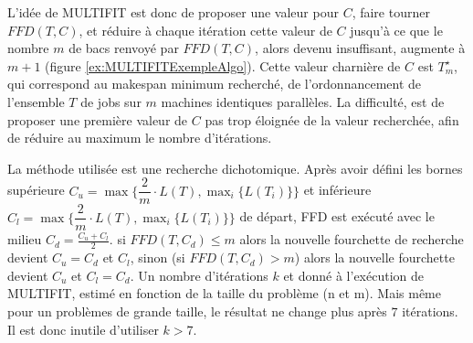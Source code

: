 \documentclass[a4paper,12pt]{report}
\theoremstyle{plain}				%
\theoremstyle{definition}				%
\newcommand{\tdi}[1]{\todo[inline]{{#1}}{}}
\newcommand{\lp}[1]{\todo[author=LP,color=yellow,inline]{#1}}
\begin{document}
\bigskip


L'idée de MULTIFIT est donc de proposer une valeur pour $C$, faire
tourner $FFD(T,C) $, et réduire à chaque itération cette valeur de $C$
jusqu'à ce que le nombre $m$ de bacs renvoyé par $FFD(T,C) $, alors
devenu insuffisant, augmente à $m+1$ (figure \ref{ex:MULTIFITExempleAlgo}).
Cette valeur charnière de $C$ est $T_m^\star$, qui correspond au
makespan minimum recherché, de l'ordonnancement de l'ensemble $T$ de
jobs sur $m$ machines identiques parallèles.
La difficulté, est de proposer une première valeur de $C$ pas trop
éloignée de la valeur recherchée, afin de réduire au maximum le nombre
d'itérations.

La méthode utilisée est une recherche dichotomique.
Après avoir défini les bornes supérieure
$C_u = \max\{\dfrac{2}{m} \cdot L(T), \max_i\{L(T_i)\} \}$ et
inférieure $C_l = \max\{\dfrac{2}{m} \cdot L(T), \max_i\{L(T_i)\} \}$
de départ, FFD est exécuté avec le milieu $C_d = \frac{C_u + C_l}{2}$.
si $FFD(T,C_d)\le m$ alors la nouvelle fourchette de recherche devient
$C_u = C_d$ et $C_l$, sinon (si $FFD(T,C_d)> m$) alors la nouvelle
fourchette devient $C_u$ et $C_l = C_d$.
Un nombre d'itérations $k$ et donné à l'exécution de MULTIFIT, estimé
en fonction de la taille du problème (n et m).
Mais même pour un problèmes de grande taille, le résultat ne change
plus après $7$ itérations.
Il est donc inutile d'utiliser $k>7$.

\begin{figure}
\end{figure}
\end{document}
